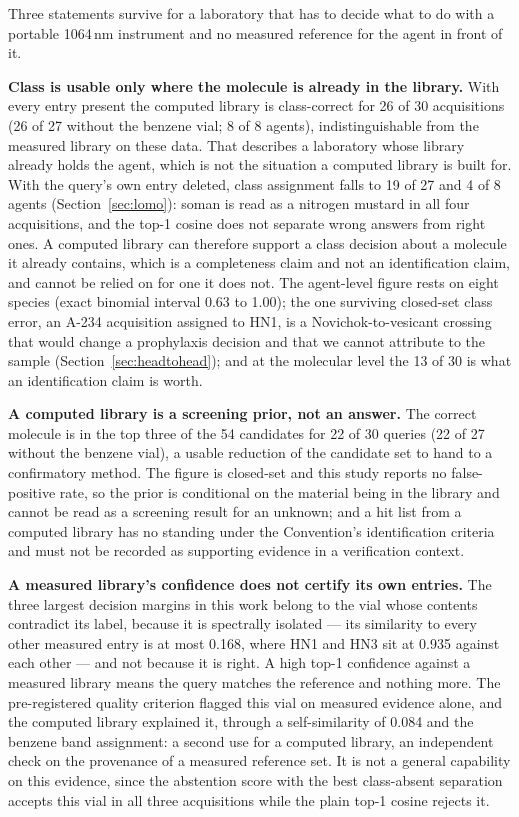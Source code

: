 \documentclass[review,12pt]{elsarticle}
\begin{document}
Three statements survive for a laboratory that has to decide what to do with a portable
1064\,nm instrument and no measured reference for the agent in front of it.

\textbf{Class is usable only where the molecule is already in the library.} With every
entry present the computed library is class-correct for 26 of 30 acquisitions (26 of 27
without the benzene vial; 8 of 8 agents), indistinguishable from the measured library on
these data. That describes a laboratory whose library already holds the agent, which is not
the situation a computed library is built for. With the query's own entry deleted, class
assignment falls to 19 of 27 and 4 of 8 agents (Section~\ref{sec:lomo}): soman is read as
a nitrogen mustard in all four acquisitions, and the top-1 cosine does not separate wrong
answers from right ones. A computed library can therefore support a class decision about a
molecule it already contains, which is a completeness claim and not an identification
claim, and cannot be relied on for one it does not. The agent-level figure rests on eight
species (exact binomial interval 0.63 to 1.00); the one surviving closed-set class error, an
A-234 acquisition assigned to HN1, is a Novichok-to-vesicant crossing that would change a
prophylaxis decision and that we cannot attribute to the sample
(Section~\ref{sec:headtohead}); and at the molecular level the 13 of 30 is what an
identification claim is worth.

\textbf{A computed library is a screening prior, not an answer.} The correct molecule is in
the top three of the 54 candidates for 22 of 30 queries (22 of 27 without the benzene vial),
a usable reduction of the candidate set to hand to a confirmatory method. The figure is
closed-set and this study reports no false-positive rate, so the prior is conditional on
the material being in the library and cannot be read as a screening result for an unknown;
and a hit list from a computed library has no standing under the Convention's identification
criteria and must not be recorded as supporting evidence in a verification context.

\textbf{A measured library's confidence does not certify its own entries.} The three largest
decision margins in this work belong to the vial whose contents contradict its label,
because it is spectrally isolated --- its similarity to every other measured entry is at
most 0.168, where HN1 and HN3 sit at 0.935 against each other --- and not because it is
right. A high top-1 confidence against a measured library means the query matches the
reference and nothing more. The pre-registered quality criterion flagged this vial on
measured evidence alone, and the computed library explained it, through a self-similarity of
0.084 and the benzene band assignment: a second use for a computed library, an independent
check on the provenance of a measured reference set. It is not a general capability on this
evidence, since the abstention score with the best class-absent separation accepts this
vial in all three acquisitions while the plain top-1 cosine rejects it.
\end{document}
